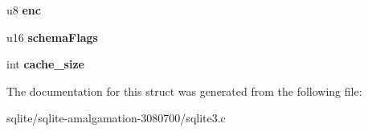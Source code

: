\begin{DoxyCompactItemize}
\item 
\hypertarget{struct_schema_a1338d09fe9cbb5a8162929202cb73cae}{u8 {\bfseries enc}}\label{struct_schema_a1338d09fe9cbb5a8162929202cb73cae}

\item 
\hypertarget{struct_schema_a19310cba7982138909683b1801258c18}{u16 {\bfseries schema\+Flags}}\label{struct_schema_a19310cba7982138909683b1801258c18}

\item 
\hypertarget{struct_schema_a0a66691be95a30c099ca4840da7110dd}{int {\bfseries cache\+\_\+size}}\label{struct_schema_a0a66691be95a30c099ca4840da7110dd}

\end{DoxyCompactItemize}


The documentation for this struct was generated from the following file\+:\begin{DoxyCompactItemize}
\item 
sqlite/sqlite-\/amalgamation-\/3080700/sqlite3.\+c\end{DoxyCompactItemize}
